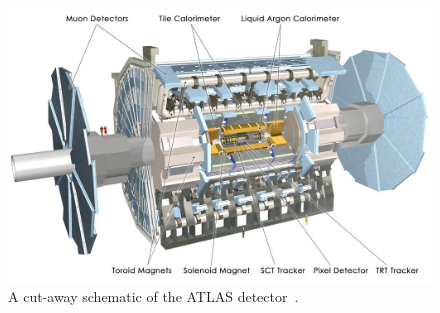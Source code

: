 \begin{figure}[!ht]
  \begin{center}
    \includegraphics[width=1\linewidth, angle=0]{figs/Detector/ATLAS_schem.jpg}
  \end{center}
  \caption[A cut-away schematic of the ATLAS detector.]{ A cut-away schematic of the ATLAS detector~\cite{det-ATLAS_Exp}.}
  \label{fig:det-ATLAS_schem}
\end{figure}
